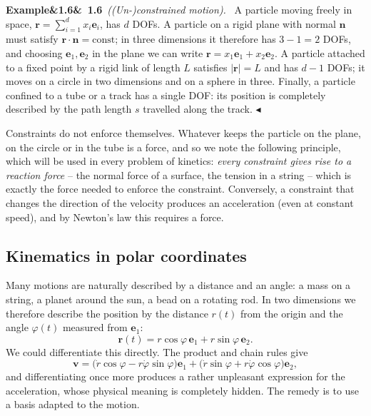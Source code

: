\documentclass[11pt,a4paper,oneside]{report}
\numberwithin{equation}{chapter}
\newcommand{\vect}[1]{\bm{#1}}
\newcommand{\e}[1]{\vect{e}_{#1}}
\theoremstyle{plain}
\theoremstyle{definition}
\theoremstyle{remark}
\newenvironment{example}[2]{%
  \par\addvspace{\bigskipamount}\noindent
  \textbf{Example\ifx&#1&\else~#1\fi}\ \textit{(#2).}\ \ignorespaces}%
  {\hfill$\blacktriangleleft$\par\addvspace{\bigskipamount}}
\newcommand{\lecture}[2]{\marginpar{\raggedright\footnotesize\textsc{Lecture #1}\\\textit{#2}}}
\begin{document}
\begin{example}{1.6}{(Un-)constrained motion}
A particle moving freely in space, $\vect r=\sum_{i=1}^dx_i\e i$, has $d$ DOFs. A particle on a rigid plane with
normal $\vect n$ must satisfy $\vect r\cdot\vect n=\text{const}$; in three dimensions it therefore has $3-1=2$ DOFs,
and choosing $\e1,\e2$ in the plane we can write $\vect r=x_1\e1+x_2\e2$. A particle attached to a fixed point by a
rigid link of length $L$ satisfies $|\vect r|=L$ and has $d-1$ DOFs; it moves on a circle in two dimensions and on a
sphere in three. Finally, a particle confined to a tube or a track has a single DOF: its position is completely
described by the path length $s$ travelled along the track.
\end{example}

Constraints do not enforce themselves. Whatever keeps the particle on the plane, on the circle or in the tube is a
force, and so we note the following principle, which will be used in every problem of kinetics:
\emph{every constraint gives rise to a reaction force} -- the normal force of a surface, the tension in a string --
which is exactly the force needed to enforce the constraint. Conversely, a constraint that changes the direction of
the velocity produces an acceleration (even at constant speed), and by Newton's law this requires a force.

\subsection{Kinematics in polar coordinates}\label{sec:polar}
\lecture{2}{21.09.2026}
Many motions are naturally described by a distance and an angle: a mass on a string, a planet around the sun, a
bead on a rotating rod. In two dimensions we therefore describe the position by the distance $r(t)$ from the origin
and the angle $\varphi(t)$ measured from $\e1$:
\begin{equation}
  \vect r(t)=r\cos\varphi\,\e1+r\sin\varphi\,\e2 .
\end{equation}
We could differentiate this directly. The product and chain rules give
\begin{equation*}
  \vect v=\big(\dot r\cos\varphi-r\dot\varphi\sin\varphi\big)\e1+\big(\dot r\sin\varphi+r\dot\varphi\cos\varphi\big)\e2,
\end{equation*}
and differentiating once more produces a rather unpleasant expression for the acceleration, whose physical meaning
is completely hidden. The remedy is to use a basis adapted to the motion.
\end{document}
